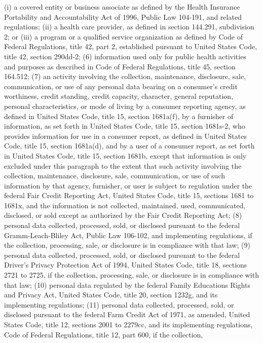 (i) a covered entity or business associate as defined by the Health Insurance Portability
and Accountability Act of 1996, Public Law 104-191, and related regulations;
(ii) a health care provider, as defined in section 144.291, subdivision 2; or
(iii) a program or a qualified service organization as defined by Code of Federal
Regulations, title 42, part 2, established pursuant to United States Code, title 42, section
290dd-2;
(6) information used only for public health activities and purposes as described in Code
of Federal Regulations, title 45, section 164.512;
(7) an activity involving the collection, maintenance, disclosure, sale, communication,
or use of any personal data bearing on a consumer's credit worthiness, credit standing, credit
capacity, character, general reputation, personal characteristics, or mode of living by a
consumer reporting agency, as defined in United States Code, title 15, section 1681a(f), by
a furnisher of information, as set forth in United States Code, title 15, section 1681s-2, who
provides information for use in a consumer report, as defined in United States Code, title
15, section 1681a(d), and by a user of a consumer report, as set forth in United States Code,
title 15, section 1681b, except that information is only excluded under this paragraph to the
extent that such activity involving the collection, maintenance, disclosure, sale,
communication, or use of such information by that agency, furnisher, or user is subject to
regulation under the federal Fair Credit Reporting Act, United States Code, title 15, sections
1681 to 1681x, and the information is not collected, maintained, used, communicated,
disclosed, or sold except as authorized by the Fair Credit Reporting Act;
(8) personal data collected, processed, sold, or disclosed pursuant to the federal
Gramm-Leach-Bliley Act, Public Law 106-102, and implementing regulations, if the
collection, processing, sale, or disclosure is in compliance with that law;
(9) personal data collected, processed, sold, or disclosed pursuant to the federal Driver's
Privacy Protection Act of 1994, United States Code, title 18, sections 2721 to 2725, if the
collection, processing, sale, or disclosure is in compliance with that law;
(10) personal data regulated by the federal Family Educations Rights and Privacy Act,
United States Code, title 20, section 1232g, and its implementing regulations;
(11) personal data collected, processed, sold, or disclosed pursuant to the federal Farm
Credit Act of 1971, as amended, United States Code, title 12, sections 2001 to 2279cc, and
its implementing regulations, Code of Federal Regulations, title 12, part 600, if the collection,
